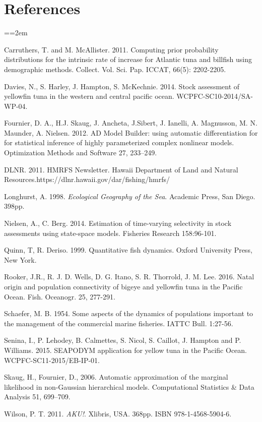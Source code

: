 \documentclass[12pt,letterpaper]{article}
\newcommand\doublespacing{\baselineskip=1.6\normalbaselineskip}
\begin{document}
\section*{References}
{\parindent=0cm \small
\everypar={\hangindent=2em }\par
Carruthers, T. and M. McAllister. 2011.
Computing prior probability distributions for the
intrinsic rate of increase for Atlantic tuna and
billfish using demographic methods.
Collect. Vol. Sci. Pap. ICCAT, 66(5): 2202-2205.

Davies, N., S. Harley, J. Hampton, S. McKechnie. 2014. Stock
assessment of yellowfin tuna in the western and central pacific ocean.
WCPFC-SC10-2014/SA-WP-04.

Fournier, D. A., H.J. Skaug, J. Ancheta, J.Sibert, J. Ianelli, 
A. Magnusson, M. N. Maunder, A. Nielsen. 2012. AD Model Builder:
using automatic differentiation for for statistical inference of highly
parameterized complex nonlinear models. Optimization Methods and
Software 27, 233–249.

DLNR. 2011. HMRFS Newsletter. Hawaii Department of Land and Natural
Resources.https://dlnr.hawaii.gov/dar/fishing/hmrfs/

Longhurst, A. 1998. {\it Ecological Geography of the Sea}. Academic
Press, San Diego. 398pp.

Nielsen, A., C. Berg. 2014. Estimation of time-varying selectivity
in stock assessments using state-space models. Fisheries Research
158:96-101.

Quinn, T, R. Deriso. 1999. Quantitative fish dynamics. Oxford
University Press, New York.

Rooker, J.R., R. J. D. Wells, D. G. Itano, S. R. Thorrold, J. M. Lee. 2016.
Natal origin and population connectivity of bigeye and
yellowfin tuna in the Pacific Ocean.
Fish. Oceanogr. 25, 277-291.

Schaefer, M. B. 1954. Some aspects of the dynamics of populations
important to the management of the commercial marine fisheries. IATTC
Bull. 1:27-56.

Senina, I.,  P. Lehodey, B. Calmettes, S. Nicol, S. Caillot,
J. Hampton and P. Williams. 2015.
SEAPODYM application for yellow tuna in the Pacific Ocean.
WCPFC-SC11-2015/EB-IP-01.

Skaug, H., Fournier, D., 2006. Automatic approximation of the marginal
likelihood in non-Gaussian hierarchical models. Computational
Statistics \& Data Analysis 51, 699–709.


Wilson, P. T. 2011. {\it AKU!}. Xlibris, USA. 368pp. ISBN
978-1-4568-5904-6.
\par}
\end{document}
